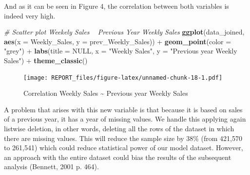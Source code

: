\documentclass[11pt,]{article}
\newenvironment{Shaded}{\begin{snugshade}}{\end{snugshade}}
\newcommand{\KeywordTok}[1]{\textcolor[rgb]{0.13,0.29,0.53}{\textbf{{#1}}}}
\newcommand{\DataTypeTok}[1]{\textcolor[rgb]{0.13,0.29,0.53}{{#1}}}
\newcommand{\DecValTok}[1]{\textcolor[rgb]{0.00,0.00,0.81}{{#1}}}
\newcommand{\StringTok}[1]{\textcolor[rgb]{0.31,0.60,0.02}{{#1}}}
\newcommand{\CommentTok}[1]{\textcolor[rgb]{0.56,0.35,0.01}{\textit{{#1}}}}
\newcommand{\OtherTok}[1]{\textcolor[rgb]{0.56,0.35,0.01}{{#1}}}
\newcommand{\NormalTok}[1]{{#1}}
\begin{document}
\begin{Shaded}
\end{Shaded}

And as it can be seen in Figure 4, the correlation between both
variables is indeed very high.

\begin{Shaded}
\begin{Highlighting}[]
\CommentTok{# Scatter plot Weekely Sales ~ Previous Year Weekly Sales}
\KeywordTok{ggplot}\NormalTok{(data_joined, }\KeywordTok{aes}\NormalTok{(}\DataTypeTok{x =} \NormalTok{Weekly_Sales, }\DataTypeTok{y =} \NormalTok{prev_Weekly_Sales)) +}\StringTok{ }
\StringTok{    }\KeywordTok{geom_point}\NormalTok{(}\DataTypeTok{color =} \StringTok{"grey"}\NormalTok{) +}\StringTok{ }\KeywordTok{labs}\NormalTok{(}\DataTypeTok{title =} \OtherTok{NULL}\NormalTok{, }\DataTypeTok{x =} \StringTok{"Weekly Sales"}\NormalTok{, }
    \DataTypeTok{y =} \StringTok{"Previous year Weekly Sales"}\NormalTok{) +}\StringTok{ }\KeywordTok{theme_classic}\NormalTok{()}
\end{Highlighting}
\end{Shaded}

\begin{figure}[htbp]
\centering
\texttt{[image: REPORT\_files/figure-latex/unnamed-chunk-18-1.pdf]}
\caption{Correlation Weekly Sales \textasciitilde{} Previous year Weekly
Sales}
\end{figure}

A problem that arises with this new variable is that because it is based
on sales of a previous year, it has a year of missing values. We handle
this applying again listwise deletion, in other words, deleting all the
rows of the dataset in which there are missing values. This will reduce
the sample size by 38\% (from 421,570 to 261,541) which could reduce
statistical power of our model dataset. However, an approach with the
entire dataset could bias the results of the subsequent analysis
(Bennett, 2001 p. 464).
\end{document}
